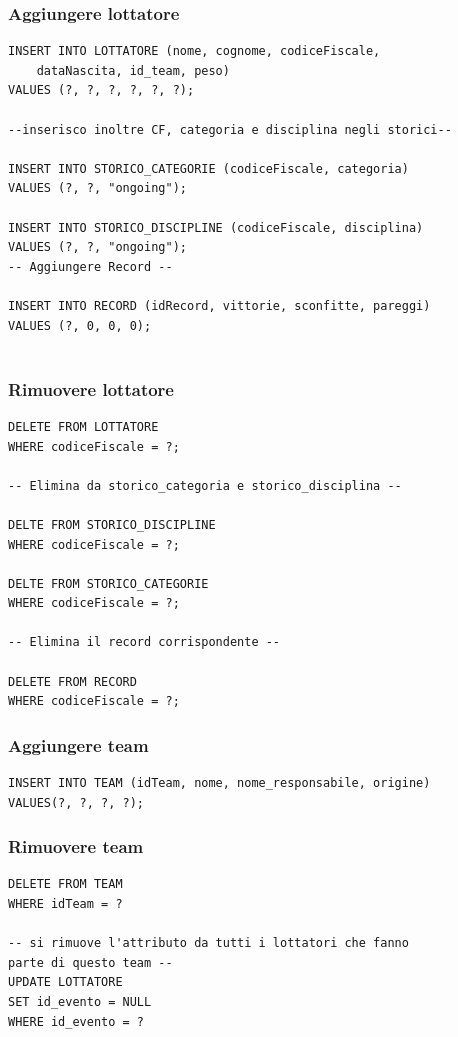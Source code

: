 \documentclass[a4paper,12pt]{report}
\begin{document}
\subsubsection{Aggiungere lottatore}
\begin{verbatim}
INSERT INTO LOTTATORE (nome, cognome, codiceFiscale, 
    dataNascita, id_team, peso)
VALUES (?, ?, ?, ?, ?, ?);

--inserisco inoltre CF, categoria e disciplina negli storici--

INSERT INTO STORICO_CATEGORIE (codiceFiscale, categoria)
VALUES (?, ?, "ongoing");

INSERT INTO STORICO_DISCIPLINE (codiceFiscale, disciplina)
VALUES (?, ?, "ongoing");
-- Aggiungere Record --

INSERT INTO RECORD (idRecord, vittorie, sconfitte, pareggi)
VALUES (?, 0, 0, 0);


\end{verbatim}
\subsubsection{Rimuovere lottatore}
\begin{verbatim}
DELETE FROM LOTTATORE
WHERE codiceFiscale = ?;

-- Elimina da storico_categoria e storico_disciplina --

DELTE FROM STORICO_DISCIPLINE
WHERE codiceFiscale = ?;

DELTE FROM STORICO_CATEGORIE
WHERE codiceFiscale = ?;

-- Elimina il record corrispondente --

DELETE FROM RECORD
WHERE codiceFiscale = ?;

\end{verbatim}
\subsubsection{Aggiungere team}
\begin{verbatim}
INSERT INTO TEAM (idTeam, nome, nome_responsabile, origine)
VALUES(?, ?, ?, ?);
\end{verbatim}
\subsubsection{Rimuovere team}
\begin{verbatim}
DELETE FROM TEAM 
WHERE idTeam = ?

-- si rimuove l'attributo da tutti i lottatori che fanno 
parte di questo team --
UPDATE LOTTATORE
SET id_evento = NULL
WHERE id_evento = ?
\end{verbatim}
\end{document}
